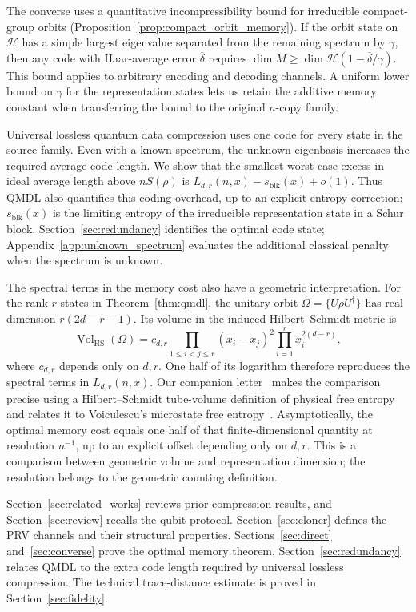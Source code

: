 \documentclass[a4paper,onecolumn,11pt]{quantumarticle}
\begin{document}
The converse uses a quantitative incompressibility bound for
irreducible compact-group orbits
(Proposition~\ref{prop:compact_orbit_memory}). If the orbit state
on $\mathcal H$ has a simple largest eigenvalue separated from the
remaining spectrum by $\gamma$, then any code with Haar-average
error $\overline\delta$ requires
$\dim M\ge\dim\mathcal H(1-\overline\delta/\gamma)$.
This bound applies to arbitrary encoding and decoding channels.
A uniform lower bound on $\gamma$ for the representation states
lets us retain the additive memory constant when transferring
the bound to the original $n$-copy family.

Universal lossless quantum data compression uses one code for every
state in the source family. Even with a known spectrum, the
unknown eigenbasis increases the required average code length.
We show that the smallest worst-case excess in ideal average length
above $nS(\rho)$ is $L_{d,r}(n,x)-s_{\mathrm{blk}}(x)+o(1)$.
Thus QMDL also quantifies this coding overhead, up to an explicit
entropy correction: $s_{\mathrm{blk}}(x)$ is the limiting entropy
of the irreducible representation state in a Schur block.
Section~\ref{sec:redundancy} identifies the optimal code state;
Appendix~\ref{app:unknown_spectrum} evaluates the additional
classical penalty when the spectrum is unknown.

The spectral terms in the memory cost also have a geometric
interpretation. For the rank-$r$ states in Theorem~\ref{thm:qmdl},
the unitary orbit $\Omega=\{U\rho U^\dagger\}$ has real dimension
$r(2d-r-1)$. Its volume in the induced Hilbert--Schmidt metric is
\[
\operatorname{Vol}_{\mathrm{HS}}(\Omega)
=c_{d,r}\prod_{1\le i<j\le r}(x_i-x_j)^2
\prod_{i=1}^r x_i^{2(d-r)},
\]
where $c_{d,r}$ depends only on $d,r$. One half of its logarithm
therefore reproduces the spectral terms in $L_{d,r}(n,x)$.
Our companion letter~\cite{paper1} makes the comparison precise
using a Hilbert--Schmidt tube-volume definition of physical free
entropy and relates it to Voiculescu's microstate free
entropy~\cite{voiculescu1993analogues,voiculescu1994analogues,voiculescu2002free}.
Asymptotically, the optimal memory cost equals one half of that
finite-dimensional quantity at resolution $n^{-1}$, up to an
explicit offset depending only on $d,r$. This is a comparison
between geometric volume and representation dimension; the
resolution belongs to the geometric counting definition.

Section~\ref{sec:related_works} reviews prior compression results,
and Section~\ref{sec:review} recalls the qubit protocol.
Section~\ref{sec:cloner} defines the PRV channels and their structural
properties. Sections~\ref{sec:direct} and~\ref{sec:converse} prove the
optimal memory theorem. Section~\ref{sec:redundancy} relates QMDL to
the extra code length required by universal lossless compression.
The technical trace-distance estimate is proved in
Section~\ref{sec:fidelity}.
\end{document}
